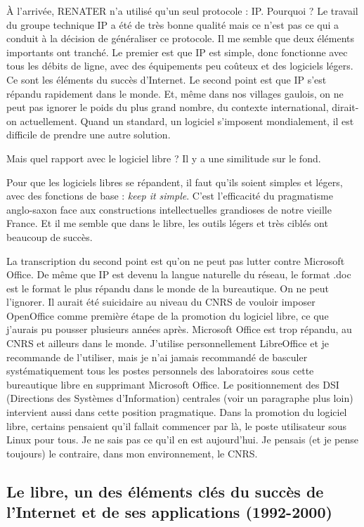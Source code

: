 \documentclass{FramateX}
\begin{document}
\begin{refsection}
À l'arrivée, RENATER n'a utilisé qu'un seul protocole : IP. Pourquoi ?
Le travail du groupe technique IP a été de très bonne qualité mais ce
n'est pas ce qui a conduit à la décision de généraliser ce protocole.
Il me semble que deux éléments importants ont tranché. Le premier est
que IP est simple, donc fonctionne avec tous les débits de ligne, avec
des équipements peu coûteux et des logiciels légers. Ce sont les
éléments du succès d'Internet. Le second point est que IP s'est répandu
rapidement dans le monde. Et, même dans nos villages gaulois, on ne
peut pas ignorer le poids du plus grand nombre, du contexte
international, dirait-on actuellement. Quand un standard, un logiciel
s'imposent mondialement, il est difficile de prendre une autre
solution.

Mais quel rapport avec le logiciel libre ? Il y a une similitude sur le
fond.

Pour que les logiciels libres se répandent, il faut qu'ils soient
simples et légers, avec des fonctions de base : \textit{keep it
simple}. C'est l'efficacité du pragmatisme anglo-saxon face aux
constructions intellectuelles grandioses de notre vieille France. Et il
me semble que dans le libre, les outils légers et très ciblés ont
beaucoup de succès.

La transcription du second point est qu'on ne peut pas lutter contre
Microsoft Office. De même que IP est devenu la langue naturelle du
réseau, le format .doc est le format le plus répandu dans le monde de
la bureautique. On ne peut l'ignorer. Il aurait été suicidaire au
niveau du CNRS de vouloir imposer OpenOffice comme première étape de la
promotion du logiciel libre, ce que j'aurais pu pousser plusieurs
années après. Microsoft Office est trop répandu, au CNRS et ailleurs
dans le monde. J'utilise personnellement LibreOffice et je recommande
de l'utiliser, mais je n'ai jamais recommandé de basculer
systématiquement tous les postes personnels des laboratoires sous cette
bureautique libre en supprimant Microsoft Office. Le positionnement des
DSI (Directions des Systèmes d'Information) centrales (voir un
paragraphe plus loin) intervient aussi dans cette position pragmatique.
Dans la promotion du logiciel libre, certains pensaient qu'il fallait
commencer par là, le poste utilisateur sous Linux pour tous. Je ne sais
pas ce qu'il en est aujourd'hui. Je pensais (et je pense toujours) le
contraire, dans mon environnement, le CNRS.


\subsection*{Le libre, un des éléments clés du succès de l'Internet et de ses
applications (1992-2000)}


\end{refsection}
\end{document}

